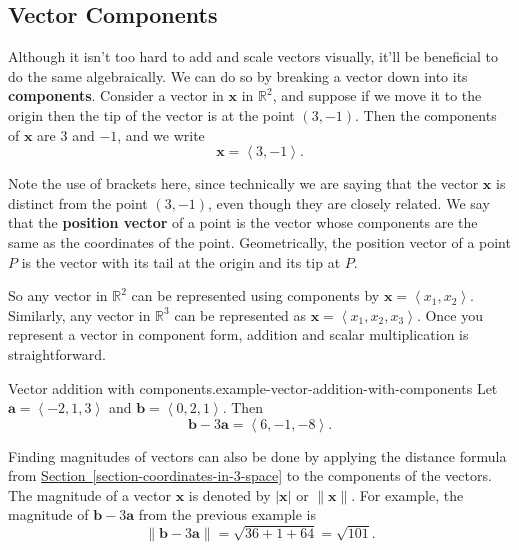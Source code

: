 \documentclass[10pt,]{book}
\newcommand{\terminology}[1]{\textbf{#1}}
\numberwithin{equation}{section}
\newcommand{\RR}{\mathbb{R}}
\newcommand{\vv}[1]{\mathbf{#1}}
\newcommand{\dotprod}[1]{\left\langle #1 \right\rangle}
\begin{document}
\subsection[{Vector Components}]{Vector Components}\label{subsection-vector-components}
\hypertarget{p-1088}{}%
Although it isn't too hard to add and scale vectors visually, it'll be beneficial to do the same algebraically. We can do so by breaking a vector down into its \terminology{components}. Consider a vector in \(\vv{x}\) in \(\RR^{2}\), and suppose if we move it to the origin then the tip of the vector is at the point \((3,-1)\). Then the components of \(\vv{x}\) are \(3\) and \(-1\), and we write%
\begin{equation*}
\vv{x} = \dotprod{3,-1}.
\end{equation*}
%
\par
\hypertarget{p-1089}{}%
Note the use of brackets here, since technically we are saying that the vector \(\vv{x}\) is distinct from the point \((3,-1)\), even though they are closely related. We say that the \terminology{position vector} of a point is the vector whose components are the same as the coordinates of the point. Geometrically, the position vector of a point \(P\) is the vector with its tail at the origin and its tip at \(P\).%
\par
\hypertarget{p-1090}{}%
So any vector in \(\RR^{2}\) can be represented using components by \(\vv{x} = \dotprod{x_{1},x_{2}}\). Similarly, any vector in \(\RR^{3}\) can be represented as \(\vv{x} = \dotprod{x_{1},x_{2},x_{3}}\). Once you represent a vector in component form, addition and scalar multiplication is straightforward.%
\begin{example}{Vector addition with components.}{example-vector-addition-with-components}%
\hypertarget{p-1091}{}%
Let \(\vv{a} = \dotprod{-2,1,3}\) and \(\vv{b} = \dotprod{0,2,1}\). Then%
%
\begin{equation*}
\vv{b}-3\vv{a} = \dotprod{6,-1,-8}.
\end{equation*}
\end{example}
\hypertarget{p-1092}{}%
Finding magnitudes of vectors can also be done by applying the distance formula from \hyperref[section-coordinates-in-3-space]{Section~\ref{section-coordinates-in-3-space}} to the components of the vectors. The magnitude of a vector \(\vv{x}\) is denoted by \(|\vv{x}|\) or \(\|\vv{x}\|\). For example, the magnitude of \(\vv{b}-3\vv{a}\) from the previous example is%
\begin{equation*}
\|\vv{b}-3\vv{a}\| = \sqrt{36+1+64} = \sqrt{101}.
\end{equation*}
\end{document}
